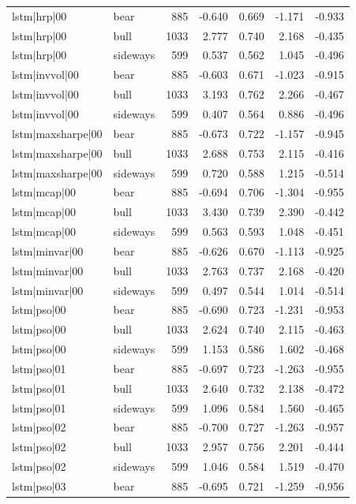 \begin{table}
\begin{tabular}{llrrrrr}
lstm|hrp|00 & bear & 885 & -0.640 & 0.669 & -1.171 & -0.933 \\
lstm|hrp|00 & bull & 1033 & 2.777 & 0.740 & 2.168 & -0.435 \\
lstm|hrp|00 & sideways & 599 & 0.537 & 0.562 & 1.045 & -0.496 \\
lstm|invvol|00 & bear & 885 & -0.603 & 0.671 & -1.023 & -0.915 \\
lstm|invvol|00 & bull & 1033 & 3.193 & 0.762 & 2.266 & -0.467 \\
lstm|invvol|00 & sideways & 599 & 0.407 & 0.564 & 0.886 & -0.496 \\
lstm|maxsharpe|00 & bear & 885 & -0.673 & 0.722 & -1.157 & -0.945 \\
lstm|maxsharpe|00 & bull & 1033 & 2.688 & 0.753 & 2.115 & -0.416 \\
lstm|maxsharpe|00 & sideways & 599 & 0.720 & 0.588 & 1.215 & -0.514 \\
lstm|mcap|00 & bear & 885 & -0.694 & 0.706 & -1.304 & -0.955 \\
lstm|mcap|00 & bull & 1033 & 3.430 & 0.739 & 2.390 & -0.442 \\
lstm|mcap|00 & sideways & 599 & 0.563 & 0.593 & 1.048 & -0.451 \\
lstm|minvar|00 & bear & 885 & -0.626 & 0.670 & -1.113 & -0.925 \\
lstm|minvar|00 & bull & 1033 & 2.763 & 0.737 & 2.168 & -0.420 \\
lstm|minvar|00 & sideways & 599 & 0.497 & 0.544 & 1.014 & -0.514 \\
lstm|pso|00 & bear & 885 & -0.690 & 0.723 & -1.231 & -0.953 \\
lstm|pso|00 & bull & 1033 & 2.624 & 0.740 & 2.115 & -0.463 \\
lstm|pso|00 & sideways & 599 & 1.153 & 0.586 & 1.602 & -0.468 \\
lstm|pso|01 & bear & 885 & -0.697 & 0.723 & -1.263 & -0.955 \\
lstm|pso|01 & bull & 1033 & 2.640 & 0.732 & 2.138 & -0.472 \\
lstm|pso|01 & sideways & 599 & 1.096 & 0.584 & 1.560 & -0.465 \\
lstm|pso|02 & bear & 885 & -0.700 & 0.727 & -1.263 & -0.957 \\
lstm|pso|02 & bull & 1033 & 2.957 & 0.756 & 2.201 & -0.444 \\
lstm|pso|02 & sideways & 599 & 1.046 & 0.584 & 1.519 & -0.470 \\
lstm|pso|03 & bear & 885 & -0.695 & 0.721 & -1.259 & -0.956 \\

\end{tabular}
\end{table}
